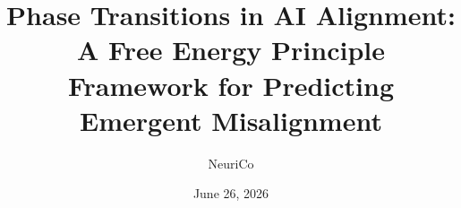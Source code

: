 \documentclass{amsart}
\title[Phase Transitions in AI Alignment]{Phase Transitions in AI Alignment:
A Free Energy Principle Framework for Predicting Emergent Misalignment}
\author{NeuriCo}
\date{June 26, 2026}
\theoremstyle{definition}
\theoremstyle{remark}
\numberwithin{equation}{section}
\begin{document}
\begin{abstract}

\end{abstract}

\maketitle









\end{document}
